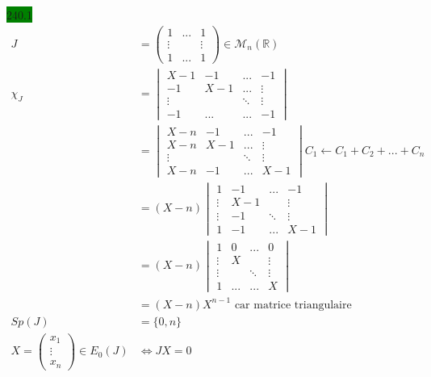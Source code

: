 \documentclass{article}
\begin{document}
\noindent \colorbox{green}{240.1}\\
\begin{align*}
    J &= \begin{pmatrix}
        1 & ... & 1 \\
        \vdots & & \vdots \\
        1 & ... & 1 
    \end{pmatrix} \in \mathcal{M}_n(\mathbb{R})\\
    \chi_J &= \begin{vmatrix}
        X-1 & -1 & ... & -1 \\
        -1 & X-1 & ... & \vdots \\ 
        \vdots & & \ddots & \vdots \\
        -1 & ... & ... & -1
    \end{vmatrix}\\
    &= \begin{vmatrix}
        X-n & -1 & ... & -1 \\
        X-n & X-1 & ... & \vdots\\
        \vdots & & \ddots & \vdots \\
        X-n & -1 & ... & X-1
    \end{vmatrix} C_1 \leftarrow C_1 + C_2 + ... + C_n \\
    &= (X-n) \begin{vmatrix}
        1 & -1 & ... & -1 \\
        \vdots & X-1 & & \vdots \\
        \vdots & -1 & \ddots & \vdots \\
        1 & -1 & ... & X-1
    \end{vmatrix}\\
    &= (X-n) \begin{vmatrix}
        1 & 0 & ... & 0 \\
        \vdots & X & & \vdots \\
        \vdots &  & \ddots & \vdots \\
        1 & ... & ... & X
    \end{vmatrix}\\
    &= (X-n)X^{n-1} \text{ car matrice triangulaire}\\
    Sp(J) &= \{0, n\}\\
    X = \begin{pmatrix}
        x_1\\\vdots\\x_n
    \end{pmatrix} \in E_0(J) &\Leftrightarrow JX = 0 \\

\end{align*}
\end{document}
